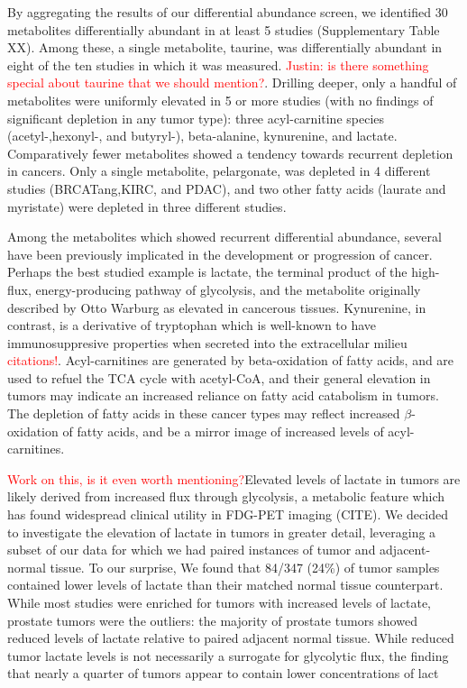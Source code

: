 \documentclass[10pt]{article}
\begin{document}
By aggregating the results of our differential abundance screen, we identified 30 metabolites differentially abundant in at least 5 studies (Supplementary Table XX). Among these, a single metabolite, taurine, was differentially abundant in eight of the ten studies in which it was measured. \textcolor{red}{Justin: is there something special about taurine that we should mention?}. Drilling deeper, only a handful of metabolites were uniformly elevated in 5 or more studies (with no findings of significant depletion in any tumor type): three acyl-carnitine species (acetyl-,hexonyl-, and butyryl-), beta-alanine, kynurenine, and lactate. Comparatively fewer metabolites showed a tendency towards recurrent depletion in cancers. Only a single metabolite, pelargonate, was depleted in 4 different studies (BRCATang,KIRC, and PDAC), and two other fatty acids (laurate and myristate) were depleted in three different studies. 

Among the metabolites which showed recurrent differential abundance, several have been previously implicated in the development or progression of cancer. Perhaps the best studied example is lactate, the terminal product of the high-flux, energy-producing pathway of glycolysis, and the metabolite originally described by Otto Warburg as elevated in cancerous tissues. Kynurenine, in contrast, is a derivative of tryptophan which is well-known to have immunosuppresive properties when secreted into the extracellular milieu \textcolor{red}{citations!}. Acyl-carnitines are generated by beta-oxidation of fatty acids, and are used to refuel the TCA cycle with acetyl-CoA, and their general elevation in tumors may indicate an increased reliance on fatty acid catabolism in tumors. The depletion of fatty acids in these cancer types may reflect increased $\beta$-oxidation of fatty acids, and be a mirror image of increased levels of acyl-carnitines. 

\textcolor{red}{Work on this, is it even worth mentioning?}Elevated levels of lactate in tumors are likely derived from increased flux through glycolysis, a metabolic feature which has found widespread clinical utility in FDG-PET imaging (CITE). We decided to investigate the elevation of lactate in tumors in greater detail, leveraging a subset of our data for which we had paired instances of tumor and adjacent-normal tissue. To our surprise, We found that 84/347 (24\%) of tumor samples contained lower levels of lactate than their matched normal tissue counterpart. While most studies were enriched for tumors with increased levels of lactate, prostate tumors were the outliers: the majority of prostate tumors showed reduced levels of lactate relative to paired adjacent normal tissue. While reduced tumor lactate levels is not necessarily a surrogate for glycolytic flux, the finding that nearly a quarter of tumors appear to contain lower concentrations of lact
\end{document}
